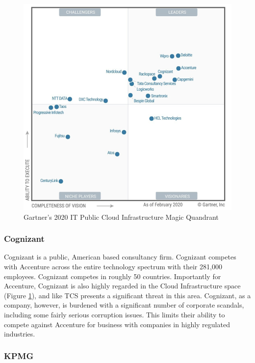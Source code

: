 \begin{figure}[h!]
  \includegraphics[width=\textwidth]{img/it_public_cloud}
  \caption{Gartner's 2020 IT Public Cloud Infrastructure Magic Quandrant}
  \label{fig:itpc}
\end{figure}


\subsubsection{Cognizant}

Cognizant is a public, American based consultancy firm. Cognizant competes with Accenture across the entire technology spectrum with their 281,000 employees. Cognizant competes in roughly 50 countries. Importantly for Accenture, Cognizant is also highly regarded in the Cloud Infrastructure space (Figure \ref{fig:itpc}), and like TCS presents a significant threat in this area. Cognizant, as a company, however, is burdened with a significant number of corporate scandals, including some fairly serious corruption issues. This limits their ability to compete against Accenture for business with companies in highly regulated industries.


\subsubsection{KPMG}

